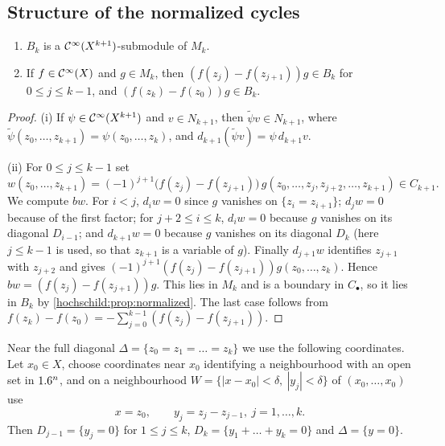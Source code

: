 \subsection{Structure of the normalized cycles}
\begin{lemma}\label{hochschild:lem:B-module}
\begin{enumerate}[label=\textup{(\roman*)}]
\item $B_k$ is a $\mathcal{C}^\infty(X^{k+1})$-submodule of $M_k$.
\item If $f\in\mathcal{C}^\infty(X)$ and $g\in M_k$, then $(f(z_j)-f(z_{j+1}))g\in B_k$ for
$0\le j\le k-1$, and $(f(z_k)-f(z_0))g\in B_k$.
\end{enumerate}
\end{lemma}
\begin{proof}
(i) If $\psi\in\mathcal{C}^\infty(X^{k+1})$ and $v\in N_{k+1}$, then
$\tilde\psi v\in N_{k+1}$, where $\tilde\psi(z_0,\dots,z_{k+1})=\psi(z_0,\dots,z_k)$,
and $d_{k+1}(\tilde\psi v)=\psi\,d_{k+1}v$.

(ii) For $0\le j\le k-1$ set
\begin{equation*}
  w(z_0,\dots,z_{k+1})=(-1)^{j+1}\bigl(f(z_j)-f(z_{j+1})\bigr)\,
  g(z_0,\dots,z_j,z_{j+2},\dots,z_{k+1})\in C_{k+1}.
\end{equation*}
We compute $bw$. For $i<j$, $d_iw=0$ since $g$ vanishes on $\{z_i=z_{i+1}\}$;
$d_jw=0$ because of the first factor; for $j+2\le i\le k$, $d_iw=0$ because
$g$ vanishes on its diagonal $D_{i-1}$; and $d_{k+1}w=0$ because $g$ vanishes
on its diagonal $D_k$ (here $j\le k-1$ is used, so that $z_{k+1}$ is a variable
of $g$). Finally $d_{j+1}w$ identifies $z_{j+1}$ with $z_{j+2}$ and gives
$(-1)^{j+1}(f(z_j)-f(z_{j+1}))g(z_0,\dots,z_k)$. Hence
$bw=(f(z_j)-f(z_{j+1}))g$. This lies in $M_k$ and is a boundary in $C_\bullet$,
so it lies in $B_k$ by \cref{hochschild:prop:normalized}. The last case
follows from $f(z_k)-f(z_0)=-\sum_{j=0}^{k-1}(f(z_j)-f(z_{j+1}))$.
\end{proof}

Near the full diagonal $\Delta=\{z_0=z_1=\dots=z_k\}$ we use the following
coordinates. Let $x_0\in X$, choose coordinates near $x_0$ identifying a
neighbourhood with an open set in $1.6^n$, and on a neighbourhood
$W=\{|x-x_0|<\delta,\ |y_j|<\delta\}$ of $(x_0,\dots,x_0)$ use
\begin{equation}
  x=z_0,\qquad y_j=z_j-z_{j-1},\ j=1,\dots,k .
  \label{hochschild:eq:diag-coords}
\end{equation}
Then $D_{j-1}=\{y_j=0\}$ for $1\le j\le k$, $D_k=\{y_1+\dots+y_k=0\}$ and
$\Delta=\{y=0\}$.

